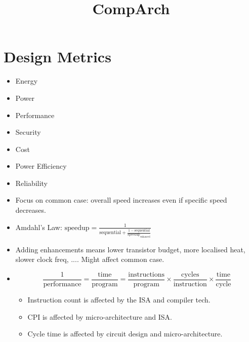 \documentclass[a4paper,11pt]{article}
\title{\vspace{-2.5cm}CompArch\vspace{-2cm}}
\author{}
\date{}
\begin{document}
\maketitle

\section*{Design Metrics}
{ 
    \begin{minipage}[t]{0.3\textwidth}
    \begin{itemize}
    \item Energy
    \item Power
    \item Performance
    \item Security
    \item Cost
    \item Power Efficiency
    \item Reliability
    \end{itemize}
    \end{minipage}
    \begin{minipage}[t]{0.65\textwidth}
    \begin{itemize}
    \item Focus on common case: overall speed increases even if specific speed decreases.
    \item Amdahl's Law: \(\text{speedup} = \frac{1}{\text{sequential} + \frac{1 - \text{sequential}}{\text{speedup}_\text{enhanced}}}\)
    \item Adding enhancements means lower transistor budget, more localised heat, slower clock freq, .... Might affect common case.
    \item
    {
        \[\frac{1}{\text{performance}} = \frac{\text{time}}{\text{program}} = \frac{\text{instructions}}{\text{program}} \times \frac{\text{cycles}}{\text{instruction}} \times \frac{\text{time}}{\text{cycle}}\]

        \begin{itemize}
        \item Instruction count is affected by the ISA and compiler tech.
        \item CPI is affected by micro-architecture and ISA.
        \item Cycle time is affected by circuit design and micro-architecture.
        \end{itemize}
    }
    \end{itemize}
    \end{minipage}
}
\end{document}
